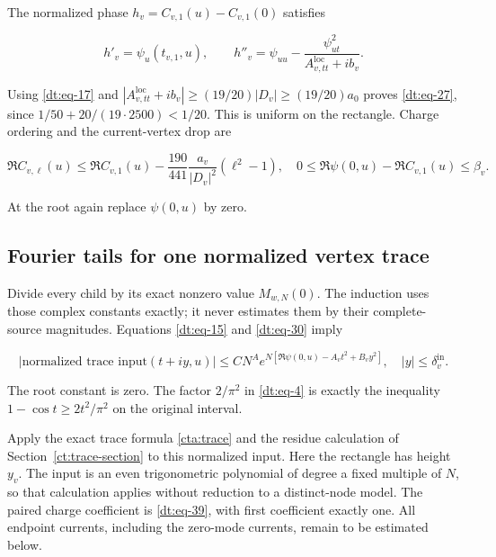 The normalized phase \(h_v=C_{v,1}(u)-C_{v,1}(0)\) satisfies

\begin{equation}\label{dt:eq-36}
h'_v=\psi_u(t_{v,1},u),\qquad
 h''_v=\psi_{uu}
       -\frac{\psi_{ut}^2}{A_{v,tt}^{\mathrm{loc}}+ib_v}.
\end{equation}

Using \eqref{dt:eq-17} and \(|A_{v,tt}^{\mathrm{loc}}+ib_v|\ge(19/20)|D_v|\ge(19/20)a_0\) proves \eqref{dt:eq-27},
since \(1/50+20/(19\cdot2500)<1/20\). This is uniform on the rectangle.
Charge ordering and the current-vertex drop are

\begin{equation}\label{dt:eq-37}
\Re C_{v,\ell}(u)\le\Re C_{v,1}(u)
  -\frac{190}{441}\frac{a_v}{|D_v|^2}(\ell^2-1),
 \quad
 0\le\Re\psi(0,u)-\Re C_{v,1}(u)\le\beta_v.
\end{equation}

At the root again replace \(\psi(0,u)\) by zero.

\subsection{Fourier tails for one normalized vertex trace}\label{dt:sec-5}

Divide every child by its exact nonzero value \(M_{w,N}(0)\). The induction
uses those complex constants exactly; it never estimates them by their
complete-source magnitudes. Equations \eqref{dt:eq-15} and \eqref{dt:eq-30} imply

\begin{equation}\label{dt:eq-38}
|\text{normalized trace input}(t+iy,u)|
 \le CN^A
   e^{N[\Re\psi(0,u)-A_vt^2+B_vy^2]},
                      \quad |y|\le\delta_v^{\mathrm{in}}.
\end{equation}

The root constant is zero. The factor \(2/\pi^2\) in \eqref{dt:eq-4} is exactly the
inequality \(1-\cos t\ge2t^2/\pi^2\) on the original interval.

Apply the exact trace formula \eqref{cta:trace} and the residue
calculation of Section~\ref{ct:trace-section} to this normalized input.
Here the rectangle has height \(y_v\). The input is an even
trigonometric polynomial of degree a fixed multiple of \(N\), so
that calculation applies without reduction to a distinct-node model.
The paired charge coefficient is \eqref{dt:eq-39}, with first
coefficient exactly one. All endpoint currents, including the
zero-mode currents, remain to be estimated below.


